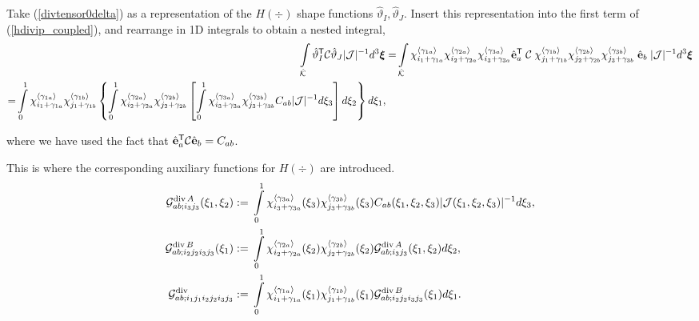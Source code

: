 Take (\ref{divtensor0delta}) as a representation of the $H(\div)$ shape functions $\hat{\vartheta}_I,\hat{\vartheta}_J$. Insert this representation into the first term of (\ref{hdivip_coupled}), and rearrange in 1D integrals to obtain a nested integral,
% 
\begin{align}
    \int\limits_{\hat{\mathcal{K}}}\hat{\vartheta}_I^{\mathsf{T}}\mathcal{C}\hat{\vartheta}_J|\mathcal{J}|^{-1}d^3\boldsymbol{\xi}
    =& \int\limits_{\hat{\mathcal{K}}}
    \chi_{i_1+\gamma_{1a}}^{\langle\gamma_{1a}\rangle}\chi_{i_2+\gamma_{2a}}^{\langle\gamma_{2a}\rangle}\chi_{i_3+\gamma_{3a}}^{\langle\gamma_{3a}\rangle}\hat{\mathbf{e}}_a^{\mathsf{T}}\; \mathcal{C}\; \chi_{j_1+\gamma_{1b}}^{\langle\gamma_{1b}\rangle}\chi_{j_2+\gamma_{2b}}^{\langle\gamma_{2b}\rangle}\chi_{j_3+\gamma_{3b}}^{\langle\gamma_{3b}\rangle}\;\hat{\mathbf{e}}_b\; |\mathcal{J}|^{-1}d^3\boldsymbol{\xi}\nonumber\\
    \begin{split}
    =& \int\limits_0^1 \chi_{i_1+\gamma_{1a}}^{\langle\gamma_{1a}\rangle}\chi_{j_1+\gamma_{1b}}^{\langle\gamma_{1b}\rangle}\left\{\int\limits_0^1 \chi_{i_2+\gamma_{2a}}^{\langle\gamma_{2a}\rangle}\chi_{j_2+\gamma_{2b}}^{\langle\gamma_{2b}\rangle} \left[ \int\limits_0^1
    \chi_{i_3+\gamma_{3a}}^{\langle\gamma_{3a}\rangle}\chi_{j_3+\gamma_{3b}}^{\langle\gamma_{3b}\rangle}C_{ab} |\mathcal{J}|^{-1} d\xi_3\right]d\xi_2\right\}d\xi_1,
    \end{split}
        \label{hdivterm1}
\end{align}

\noindent where we have used the fact that $\hat{\mathbf{e}}_a^{\mathsf{T}}\mathcal{C}\hat{\mathbf{e}}_b=C_{ab}$.

This is where the corresponding auxiliary functions for $H(\div)$ are introduced. 
% 
\begin{align}
    \mathcal{G}^{\operatorname{div} A}_{ab;i_3j_3}(\xi_1,\xi_2):={}&\int\limits_0^1 \chi_{i_3+\gamma_{3a}}^{\langle\gamma_{3a}\rangle}(\xi_3)\chi_{j_3+\gamma_{3b}}^{\langle\gamma_{3b}\rangle}(\xi_3) C_{ab}(\xi_1,\xi_2,\xi_3) |\mathcal{J}(\xi_1,\xi_2,\xi_3)|^{-1} d\xi_3,\label{GA_hdiv}\\
    \mathcal{G}^{\operatorname{div} B}_{ab;i_2j_2i_3j_3}(\xi_1):={}&\int\limits_0^1 \chi_{i_2+\gamma_{2a}}^{\langle\gamma_{2a}\rangle}(\xi_2)\chi_{j_2+\gamma_{2b}}^{\langle\gamma_{2b}\rangle}(\xi_2)
    \mathcal{G}^{\operatorname{div} A}_{ab;i_3j_3}(\xi_1,\xi_2) d\xi_2,\label{GB_hdiv}\\
    \mathcal{G}^{\operatorname{div}}_{ab;i_1j_1i_2j_2i_3j_3}:={}&\int\limits_0^1
    \chi_{i_1+\gamma_{1a}}^{\langle\gamma_{1a}\rangle}(\xi_1)\chi_{j_1+\gamma_{1b}}^{\langle\gamma_{1b}\rangle}(\xi_1)
    \mathcal{G}^{\operatorname{div} B}_{ab;i_2j_2i_3j_3}(\xi_1) d\xi_1.\label{ip_hdiv_GAB}
\end{align}

